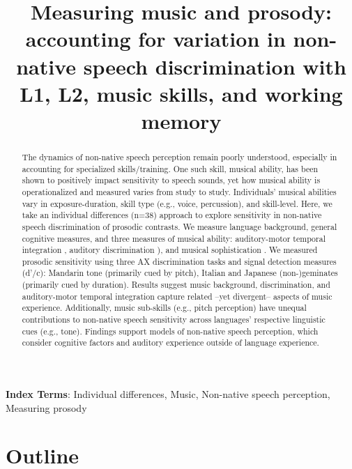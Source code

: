 \documentclass[a4paper]{article}
\title{Measuring music and prosody: accounting for variation in non-native speech discrimination with L1, L2, music skills, and working memory}
\begin{document}
\maketitle
% 
\begin{abstract}
The dynamics of non-native speech perception remain poorly understood, especially in accounting for specialized skills/training. One such skill, musical ability, has been shown to positively impact sensitivity to speech sounds, yet how musical ability is operationalized and measured varies from study to study. Individuals’ musical abilities vary in exposure-duration, skill type (e.g., voice, percussion), and skill-level. Here, we take an individual differences (n=38) approach to explore sensitivity in non-native speech discrimination of prosodic contrasts. We measure language background, general cognitive measures, and three measures of musical ability: auditory-motor temporal integration \cite{Kachlicka_Saito_Tierney_2019}, auditory discrimination \cite[MET;]{Wallentin_Nielsen_Friis-Olivarius_Vuust_Vuust_2010}), and musical sophistication \cite[Gold-MSI;]{Müllensiefen_Gingras_Musil_Stewart_2014}. We measured prosodic sensitivity using three AX discrimination tasks and signal detection measures (d'/c): Mandarin tone (primarily cued by pitch), Italian and Japanese (non-)geminates (primarily cued by duration). Results suggest music background, discrimination, and auditory-motor temporal integration capture related –yet divergent– aspects of music experience. Additionally, music sub-skills (e.g., pitch perception) have unequal contributions to non-native speech sensitivity across languages' respective linguistic cues (e.g., tone). Findings support models of non-native speech perception, which consider cognitive factors and auditory experience outside of language experience.

\end{abstract}
\noindent\textbf{Index Terms}:  Individual differences, Music, Non-native speech perception, Measuring prosody

\section{Outline}


\end{document}
